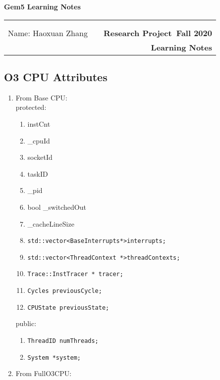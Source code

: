 \documentclass[11pt]{article}
\makeatletter
\newcommand{\course}{Research Project}
\newcommand{\semester}{Fall 2020}
\newcommand{\hwk}{Learning Notes}
\newcommand{\reportname}{Gem5 Learning Notes}
\renewcommand\maketitle{
\begin{center}
  {\huge\bf\reportname}\\
\begin{tabular*}{6.44in}{l @{\extracolsep{\fill}}c r}
\bfseries   &   &  \bfseries \\
\bfseries   &   &  \bfseries \\
Name: Haoxuan Zhang \bfseries  &  & \bfseries \course ~\semester\\
 \bfseries&  & \bfseries  \hwk
\end{tabular*}
\end{center} }
\makeatother
\begin{document}
\maketitle
{}


\subsection{O3 CPU Attributes}
	\begin{enumerate}
		\item From Base CPU:\\
		
		protected:
			\begin{enumerate}[label={\arabic*.}]
				\item instCnt
				\item \_cpuId
        \item socketId
        \item taskID
        \item \_pid
        \item bool \_switchedOut
        \item \_cacheLineSize
        \item \texttt{std::vector\textless BaseInterrupts*\textgreater interrupts;}
        \item \texttt{std::vector\textless ThreadContext *\textgreater threadContexts;}
        \item \texttt{Trace::InstTracer * tracer;}
        \item \texttt{Cycles previousCycle;}
    		\item \texttt{CPUState previousState;}
			\end{enumerate}
		public:
			\begin{enumerate}[label={\arabic*.}]
				\item \texttt{ThreadID numThreads;}
				\item \texttt{System *system;}
			\end{enumerate}
			
		\item From FullO3CPU:\\
		

\end{enumerate}
\end{document}
